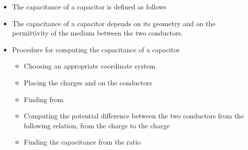 \begin{ELjoin}

\begin{itemize}
\tightlist
\item
  The capacitance of a capacitor is defined as follows
\end{itemize}

\begin{ELdefinition}{}


\end{ELdefinition}

\end{ELjoin}

\begin{ELunit}

\begin{itemize}
\tightlist
\item
  The capacitance of a capacitor depends on its geometry and on the permittivity of the medium between the two conductors.
\item
  Procedure for computing the capacitance of a capacitor

  \begin{itemize}
  \tightlist
  \item
    Choosing an appropriate coordinate system
  \item
    Placing the charges  and  on the conductors
  \item
    Finding  from 
  \item
    Computing the potential difference between the two conductors from the following relation, from the charge  to the charge 
  \item
    Finding the capacitance from the ratio 
  \end{itemize}
\end{itemize}

\end{ELunit}


